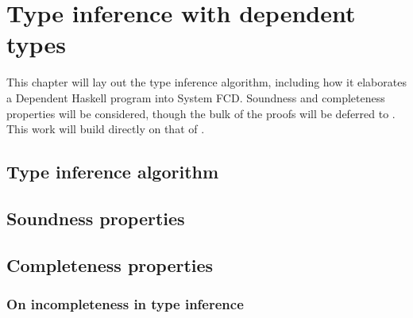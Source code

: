 \chapter{Type inference with dependent types}
\label{cha:type-inference}

\begin{proposal}
This chapter will lay out the type inference algorithm, including how it
elaborates a Dependent Haskell program into System FCD. Soundness and
completeness properties will be considered, though the bulk of the proofs
will be deferred to . This work will build directly
on that of \citet{outsidein}.
\end{proposal}

\section{Type inference algorithm}

\section{Soundness properties}

\section{Completeness properties}

\subsection{On incompleteness in type inference}
\label{sec:incomplete}
